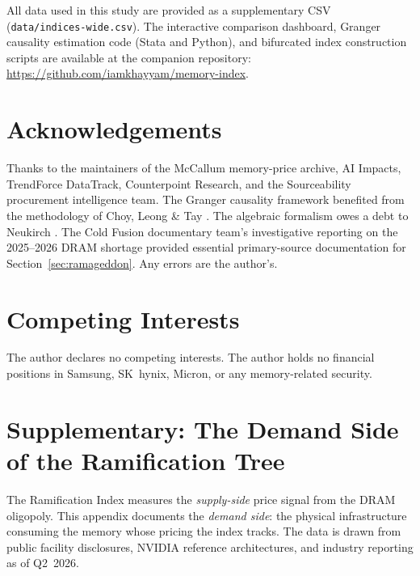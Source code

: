 \documentclass[12pt]{article}
\theoremstyle{definition}
\begin{document}
All data used in this study are provided as a supplementary CSV (\texttt{data/indices-wide.csv}). The interactive comparison dashboard, Granger causality estimation code (Stata and Python), and bifurcated index construction scripts are available at the companion repository: \url{https://github.com/iamkhayyam/memory-index}.


\section*{Acknowledgements}

Thanks to the maintainers of the McCallum memory-price archive, AI Impacts, TrendForce DataTrack, Counterpoint Research, and the Sourceability procurement intelligence team. The Granger causality framework benefited from the methodology of Choy, Leong \& Tay \cite{ChoyLeongTay2006}. The algebraic formalism owes a debt to Neukirch \cite{Neukirch1999}. The Cold Fusion documentary team's investigative reporting on the 2025--2026 DRAM shortage provided essential primary-source documentation for Section~\ref{sec:ramageddon}. Any errors are the author's.


\section*{Competing Interests}

The author declares no competing interests. The author holds no financial positions in Samsung, SK~hynix, Micron, or any memory-related security.


\appendix

\section{Supplementary: The Demand Side of the Ramification Tree}
\label{app:datacenters}

The Ramification Index measures the \emph{supply-side} price signal from the DRAM oligopoly. This appendix documents the \emph{demand side}: the physical infrastructure consuming the memory whose pricing the index tracks. The data is drawn from public facility disclosures, NVIDIA reference architectures, and industry reporting as of Q2~2026.
\end{document}
